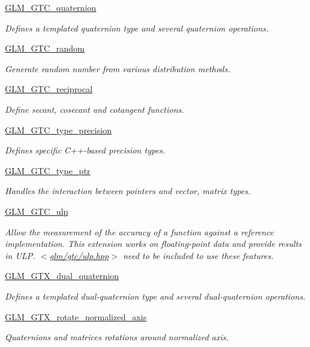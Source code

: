 \begin{DoxyCompactItemize}
\hyperlink{group__gtc__quaternion}{G\+L\+M\+\_\+\+G\+T\+C\+\_\+quaternion}
\begin{DoxyCompactList}\small\item\em Defines a templated quaternion type and several quaternion operations. \end{DoxyCompactList}\item 
\hyperlink{group__gtc__random}{G\+L\+M\+\_\+\+G\+T\+C\+\_\+random}
\begin{DoxyCompactList}\small\item\em Generate random number from various distribution methods. \end{DoxyCompactList}\item 
\hyperlink{group__gtc__reciprocal}{G\+L\+M\+\_\+\+G\+T\+C\+\_\+reciprocal}
\begin{DoxyCompactList}\small\item\em Define secant, cosecant and cotangent functions. \end{DoxyCompactList}\item 
\hyperlink{group__gtc__type__precision}{G\+L\+M\+\_\+\+G\+T\+C\+\_\+type\+\_\+precision}
\begin{DoxyCompactList}\small\item\em Defines specific C++-\/based precision types. \end{DoxyCompactList}\item 
\hyperlink{group__gtc__type__ptr}{G\+L\+M\+\_\+\+G\+T\+C\+\_\+type\+\_\+ptr}
\begin{DoxyCompactList}\small\item\em Handles the interaction between pointers and vector, matrix types. \end{DoxyCompactList}\item 
\hyperlink{group__gtc__ulp}{G\+L\+M\+\_\+\+G\+T\+C\+\_\+ulp}
\begin{DoxyCompactList}\small\item\em Allow the measurement of the accuracy of a function against a reference implementation. This extension works on floating-\/point data and provide results in U\+LP. $<$\hyperlink{gtc_2ulp_8hpp}{glm/gtc/ulp.\+hpp}$>$ need to be included to use these features. \end{DoxyCompactList}\item 
\hyperlink{group__gtc__dual__quaternion}{G\+L\+M\+\_\+\+G\+T\+X\+\_\+dual\+\_\+quaternion}
\begin{DoxyCompactList}\small\item\em Defines a templated dual-\/quaternion type and several dual-\/quaternion operations. \end{DoxyCompactList}\item 
\hyperlink{group__gtx__rotate__normalized__axis}{G\+L\+M\+\_\+\+G\+T\+X\+\_\+rotate\+\_\+normalized\+\_\+axis}
\begin{DoxyCompactList}\small\item\em Quaternions and matrices rotations around normalized axis. \end{DoxyCompactList}\end{DoxyCompactItemize}


